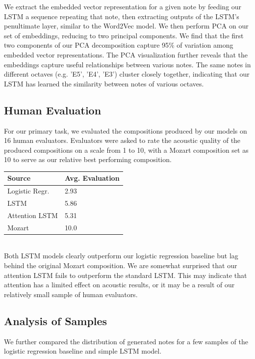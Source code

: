 \documentclass[twoside,twocolumn]{article}
\begin{document}
We extract the embedded vector representation for a given note by feeding our LSTM a sequence repeating that note, then extracting outputs of the LSTM's penultimate layer, similar to the Word2Vec model. We then perform PCA on our set of embeddings, reducing to two principal components. We find that the first two components of our PCA decomposition capture 95\% of variation among embedded vector representations. The PCA visualization further reveals that the embeddings capture useful relationships between various notes. The same notes in different octaves (e.g. 'E5', 'E4', 'E3') cluster closely together, indicating that our LSTM has learned the similarity between notes of various octaves.

\subsection{Human Evaluation}
For our primary task, we evaluated the compositions produced by our models on 16 human
evaluators. Evaluators were asked to rate the acoustic quality of the produced
compositions on a scale from 1 to 10, with a Mozart composition set as 10 to
serve as our relative best performing composition.

\begin{tabular}{|l|l|}
\hline
\textbf{Source} & \textbf{Avg. Evaluation} \\ \hline
Logistic Regr.  & 2.93                  \\ \hline
LSTM            & 5.86                  \\ \hline
Attention LSTM  & 5.31                  \\ \hline
Mozart          & 10.0                  \\ \hline
\end{tabular} \\

Both LSTM models clearly outperform our logistic regression baseline but lag behind the original Mozart composition. We are somewhat surprised that our attention LSTM fails to outperform the standard LSTM. This may indicate that attention has a limited effect on acoustic results, or it may be a result of our relatively small sample of human evaluators.

\subsection{Analysis of Samples}
We further compared the distribution of generated notes for a few samples of the logistic regression baseline and simple LSTM model.
\end{document}
